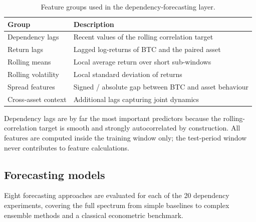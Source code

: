 \documentclass[12pt, a4paper]{article}
\begin{document}
\begin{table}[H]
  \centering
  \caption{Feature groups used in the dependency-forecasting layer.}
  \label{tab:features}
  \begin{tabular}{ll}
    \toprule
    Group                & Description \\
    \midrule
    Dependency lags      & Recent values of the rolling correlation target \\
    Return lags          & Lagged log-returns of BTC and the paired asset \\
    Rolling means        & Local average return over short sub-windows \\
    Rolling volatility   & Local standard deviation of returns \\
    Spread features      & Signed / absolute gap between BTC and asset behaviour \\
    Cross-asset context  & Additional lags capturing joint dynamics \\
    \bottomrule
  \end{tabular}
\end{table}

Dependency lags are by far the most important predictors because
the rolling-correlation target is smooth and strongly autocorrelated
by construction.
All features are computed inside the training window only;
the test-period window never contributes to feature calculations.

\subsection{Forecasting models}

Eight forecasting approaches are evaluated for each of the 20
dependency experiments, covering the full spectrum from simple
baselines to complex ensemble methods and a classical
econometric benchmark.
\end{document}
